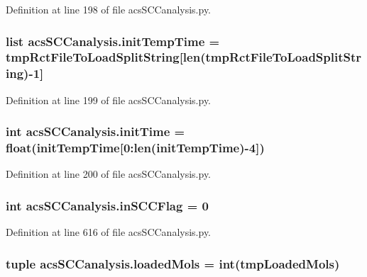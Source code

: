 Definition at line 198 of file acs\-S\-C\-Canalysis.\-py.

\hypertarget{a00096_adc4403c4cfe080918c8b9da692c50509}{
\subsubsection[{init\-Temp\-Time}]{\setlength{\rightskip}{0pt plus 5cm}list acs\-S\-C\-Canalysis.\-init\-Temp\-Time = {\bf tmp\-Rct\-File\-To\-Load\-Split\-String}\mbox{[}len({\bf tmp\-Rct\-File\-To\-Load\-Split\-String})-\/1\mbox{]}}}\label{a00096_adc4403c4cfe080918c8b9da692c50509}


Definition at line 199 of file acs\-S\-C\-Canalysis.\-py.

\hypertarget{a00096_a826c1b0585b4e8474c76f92bd7583836}{
\subsubsection[{init\-Time}]{\setlength{\rightskip}{0pt plus 5cm}int acs\-S\-C\-Canalysis.\-init\-Time = float({\bf init\-Temp\-Time}\mbox{[}0\-:len({\bf init\-Temp\-Time})-\/4\mbox{]})}}\label{a00096_a826c1b0585b4e8474c76f92bd7583836}


Definition at line 200 of file acs\-S\-C\-Canalysis.\-py.

\hypertarget{a00096_a6405b6b05e7b87812422cc30d2034904}{
\subsubsection[{in\-S\-C\-C\-Flag}]{\setlength{\rightskip}{0pt plus 5cm}int acs\-S\-C\-Canalysis.\-in\-S\-C\-C\-Flag = 0}}\label{a00096_a6405b6b05e7b87812422cc30d2034904}


Definition at line 616 of file acs\-S\-C\-Canalysis.\-py.

\hypertarget{a00096_ab4566d46d368eb4f93ff6db5191648bd}{
\subsubsection[{loaded\-Mols}]{\setlength{\rightskip}{0pt plus 5cm}tuple acs\-S\-C\-Canalysis.\-loaded\-Mols = int(tmp\-Loaded\-Mols)}}\label{a00096_ab4566d46d368eb4f93ff6db5191648bd}


